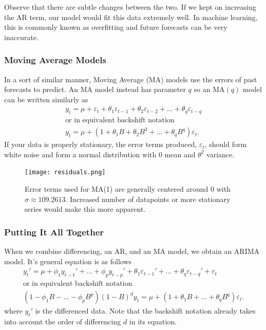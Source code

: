 \documentclass{article}
\begin{document}
    Observe that there are subtle changes between the two. If we kept on increasing the AR term, our model would fit this data extremely well. In machine learning, this is commonly known as overfitting and future forecasts can be very inaccurate.

  \subsubsection{Moving Average Models}
    In a sort of similar manner, Moving Average (MA) models use the errors of past forecasts to predict. An MA model instead has parameter $q$ so an MA$(q)$ model can be written similarly as
    \begin{gather*}
      y_t = \mu + \varepsilon_t + \theta_1 \varepsilon_{t-1} + \theta_2 \varepsilon_{t-2} + ... + \theta_q \varepsilon_{t-q}\\
      \text{or in equivalent backshift notation}\\
      y_t = \mu + (1 + \theta_1B + \theta_2B^2 + ... + \theta_qB^q)\varepsilon_t.
    \end{gather*}
    If your data is properly stationary, the error terms produced, $\varepsilon_t$, should form white noise and form a normal distribution with $0$ mean and $\theta^2$ variance.
    
    \begin{figure}[H]
      \centering
      \captionsetup{justification=centering}
      \texttt{[image: residuals.png]}
      \caption{Error terms used for MA(1) are generally centered around 0 with $\sigma \approx 109.2613$. Increased number of datapoints or more stationary series would make this more apparent.}
    \end{figure}

  \subsubsection{Putting It All Together}
  When we combine differencing, an AR, and an MA model, we obtain an ARIMA model. It's general equation is as follows
  \begin{gather*}
    y_t' = \mu + \phi_1 y_{t-1}' + ... + \phi_p y_{t-p}' + \theta_1 \varepsilon_{t-1}' + ... + \theta_q \varepsilon_{t-q}' + \varepsilon_t\\
    \text{or in equivalent backshift notation}\\
    (1 - \phi_1B - ... - \phi_pB^p)(1-B)^dy_t = \mu + (1 + \theta_1B + ... + \theta_qB^q)\varepsilon_t.
  \end{gather*}
  where $y_t'$ is the differenced data. Note that the backshift notation already takes into account the order of differencing $d$ in its equation.
\end{document}
